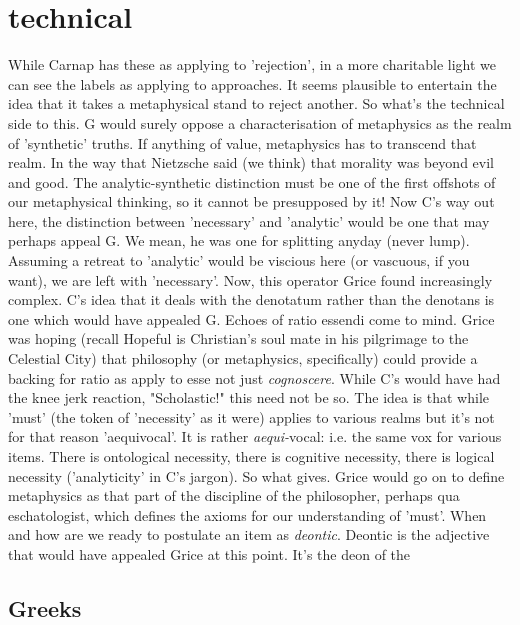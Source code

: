 \documentclass[10pt,titlepage]{book}
\begin{document}
{\section{technical}

While Carnap has these as applying to 'rejection', in a more  
charitable light we can see the labels as applying to approaches. It seems  
plausible to entertain the idea that it takes a metaphysical stand to reject  
another. So what's the technical side to this. G would surely oppose a  
characterisation of metaphysics as the realm of 'synthetic' truths. If anything  
of value, metaphysics has to transcend that realm. In the way that 
Nietzsche  said (we think) that morality was beyond evil and good. The 
analytic-synthetic  distinction must be one of the first offshots of our metaphysical 
thinking, so  it cannot be presupposed by it! Now C's way out here, the 
distinction between  'necessary' and 'analytic' would be one that may perhaps 
appeal G. We mean, he  was one for splitting anyday (never lump). Assuming a 
retreat to 'analytic'  would be viscious here (or vascuous, if you want), we 
are left with 'necessary'.  Now, this operator Grice found increasingly 
complex. C's idea that it deals with  the denotatum rather than the denotans is 
one which would have appealed G.  Echoes of ratio essendi come to mind. Grice 
was hoping (recall Hopeful is  Christian's soul mate in his pilgrimage to 
the Celestial City) that philosophy  (or metaphysics, specifically) could 
provide a backing for ratio as apply to  esse not just {\it cognoscere}. While 
C's would have had the knee jerk reaction,  "Scholastic!" this need not be so. 
The idea is that while 'must' (the token of  'necessity' as it were) 
applies to various realms but it's not for that reason  'aequivocal'. It is rather 
{\it aequi-}vocal: i.e. the same vox for various items.  There is ontological 
necessity, there is cognitive necessity, there is logical  necessity 
('analyticity' in C's jargon). So what gives. Grice would go on to  define 
metaphysics as that part of the discipline of the philosopher, perhaps  qua 
eschatologist, which defines the axioms for our understanding of 'must'.  When and 
how are we ready to postulate an item as {\it deontic}. Deontic is the  
adjective that would have appealed Grice at this point. It's the deon of the  

\subsection{Greeks}

}
\end{document}

